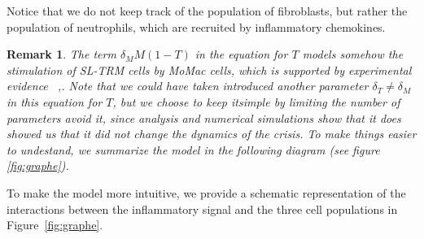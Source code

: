 \documentclass[a4paper, 12pt]{article}
\newtheorem{rem}{Remark}[section]
\providecommand{\DIFaddtex}[1]{{\protect\color{blue} \sf #1}} %
\providecommand{\DIFdeltex}[1]{{\protect\color{red} \scriptsize #1}} %
\providecommand{\DIFaddbegin}{} %
\providecommand{\DIFaddend}{} %
\providecommand{\DIFdelbegin}{} %
\providecommand{\DIFdelend}{} %
\providecommand{\DIFadd}[1]{\texorpdfstring{\DIFaddtex{#1}}{#1}} %
\providecommand{\DIFdel}[1]{\texorpdfstring{\DIFdeltex{#1}}{}} %
\begin{document}
\DIFdel{Notice that we do not keep track of the population of fibroblasts, but rather the population of neutrophils, which are recruited by inflammatory chemokines.}%
\DIFdelend \begin{rem}
The term $\delta_M M (1-T)$ in the equation for $T$ models  \DIFdelbegin \DIFdel{somehow }\DIFdelend the stimulation of  SL-TRM cells by MoMac cells, which is supported by experimental evidence\DIFaddbegin \DIFadd{~\cite{STA},}\DIFaddend \cite{weihaupt26}.
Note that we could have \DIFdelbegin \DIFdel{taken }\DIFdelend \DIFaddbegin \DIFadd{introduced }\DIFaddend another parameter $\delta_T\neq \delta_M$ in this equation for $T$, but we choose to \DIFdelbegin \DIFdel{keep itsimple by limiting the number of parameters}\DIFdelend \DIFaddbegin \DIFadd{avoid it}\DIFaddend , since analysis and numerical simulations \DIFdelbegin \DIFdel{show that it does }\DIFdelend \DIFaddbegin \DIFadd{showed us that it did }\DIFaddend not change the dynamics of the crisis.
\DIFdelbegin \DIFdel{To make things easier to undestand, we summarize the model in the following diagram (see figure \ref{fig:graphe}).
}%

\DIFdelend \DIFaddbegin \end{rem}
\DIFadd{To make the model more intuitive, we provide a schematic representation of the interactions between the inflammatory signal and the three cell populations in Figure~\ref{fig:graphe}.
}\DIFaddend \usetikzlibrary{decorations.markings}
\end{document}
